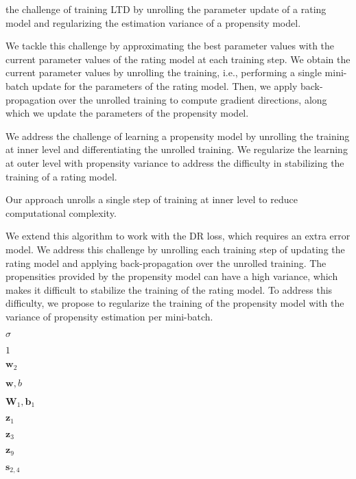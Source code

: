 the challenge of training LTD by unrolling the parameter update of a rating model and regularizing the estimation variance of a propensity model.

We tackle this challenge by approximating the best parameter values with the current parameter values of the rating model at each training step.
We obtain the current parameter values by unrolling the training, i.e., performing a single mini-batch update for the parameters of the rating model.
Then, we apply back-propagation over the unrolled training to compute gradient directions, along which we update the parameters of the propensity model.

We address the challenge of learning a propensity model by unrolling the training at inner level and differentiating the unrolled training.
We regularize the learning at outer level with propensity variance to address the difficulty in stabilizing the training of a rating model.

Our approach unrolls a single step of training at inner level to reduce computational complexity.

We extend this algorithm to work with the DR loss, which requires an extra error model.
We address this challenge by unrolling each training step of updating the rating model and applying back-propagation over the unrolled training.
The propensities provided by the propensity model can have a high variance, which makes it difficult to stabilize the training of the rating model.
To address this difficulty, we propose to regularize the training of the propensity model with the variance of propensity estimation per mini-batch.

$\sigma$

$1$

$\bm{w}_2$

$\bm{w}, b$

$\mathbf{W}_1, \bm{b}_1$

$\bm{z}_1$

$\bm{z}_3$

$\bm{z}_9$

$\bm{s}_{2,4}$
